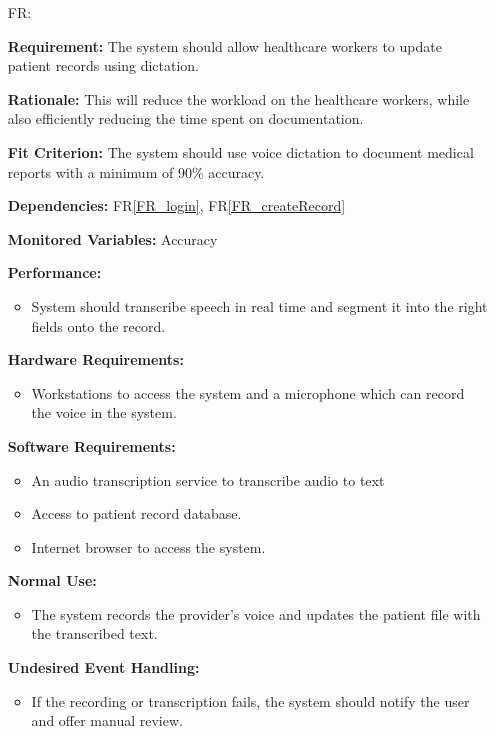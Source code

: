 \documentclass[12pt]{article}
\newcounter{reqnum} %
\begin{document}
\begin{itemize}
\item[FR\refstepcounter{reqnum}\thereqnum \label{FR_DictationRecording}:]

\textbf{Requirement:} The system should allow healthcare workers to update patient records using dictation. 
    
\textbf{Rationale:} This will reduce the workload on the healthcare workers, while also efficiently reducing the time spent on documentation. 
    
\textbf{Fit Criterion:} The system should use voice dictation to document medical reports with a minimum of 90\% accuracy. 
    
\textbf{Dependencies:} FR\ref{FR_login}, FR\ref{FR_createRecord}
    
\textbf{Monitored Variables:} Accuracy
    
\textbf{Performance:} 
  \begin{itemize}
      \item System should transcribe speech in real time and segment it into the right fields onto the record.
  \end{itemize}
    
\textbf{Hardware Requirements:}
  \begin{itemize}
      \item Workstations to access the system and a microphone which can record the voice in the system. 
  \end{itemize}
    
\textbf{Software Requirements:}
  \begin{itemize}
      \item An audio transcription service to transcribe audio to text 
      \item Access to patient record database. 
      \item Internet browser to access the system.  
  \end{itemize}
    
\textbf{Normal Use:} 
\begin{itemize}
  \item The system records the provider's voice and updates the patient file with the transcribed text.
\end{itemize}
    
\textbf{Undesired Event Handling:} 
\begin{itemize}
  \item If the recording or transcription fails, the system should notify the user and offer manual review.
\end{itemize}



\end{itemize}
\end{document}
